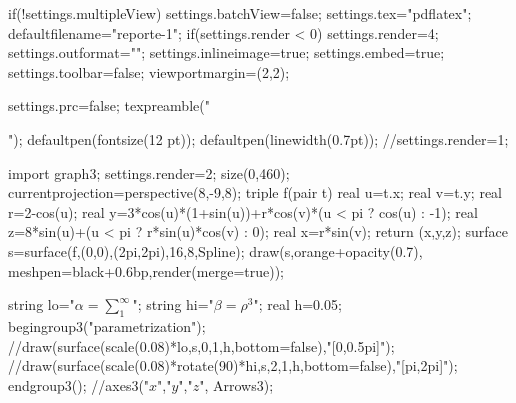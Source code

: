 if(!settings.multipleView) settings.batchView=false;
settings.tex="pdflatex";
defaultfilename="reporte-1";
if(settings.render < 0) settings.render=4;
settings.outformat="";
settings.inlineimage=true;
settings.embed=true;
settings.toolbar=false;
viewportmargin=(2,2);

settings.prc=false;
texpreamble("\usepackage[lite,subscriptcorrection,slantedGreek,nofontinfo,amsbb,eucal]{mtpro2}");
defaultpen(fontsize(12 pt));
defaultpen(linewidth(0.7pt));
//settings.render=1;

import graph3;
settings.render=2;
size(0,460);
currentprojection=perspective(8,-9,8);
triple f(pair t) {
real u=t.x;
real v=t.y;
real r=2-cos(u);
real y=3*cos(u)*(1+sin(u))+r*cos(v)*(u < pi ? cos(u) : -1);
real z=8*sin(u)+(u < pi ? r*sin(u)*cos(v) : 0);
real x=r*sin(v);
return (x,y,z);
}
surface s=surface(f,(0,0),(2pi,2pi),16,8,Spline);
draw(s,orange+opacity(0.7), meshpen=black+0.6bp,render(merge=true));

string lo="$\alpha=\sum_1^\infty$";
string hi="$\beta=\rho^3$";
real h=0.05;
begingroup3("parametrization");
//draw(surface(scale(0.08)*lo,s,0,1,h,bottom=false),"[0,0.5pi]");
//draw(surface(scale(0.08)*rotate(90)*hi,s,2,1,h,bottom=false),"[pi,2pi]");
endgroup3();
//axes3("$x$","$y$","$z$", Arrows3);
